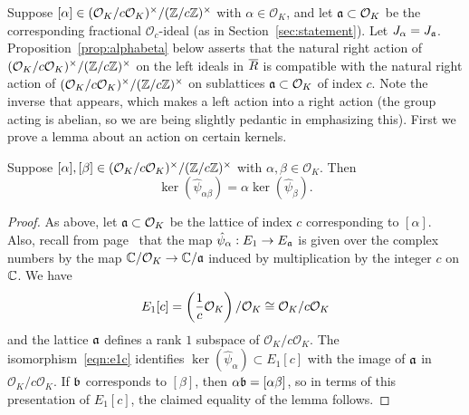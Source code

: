 \documentclass{article} \usepackage[active]{srcltx}
\renewcommand{\O}{\mathcal{O}}
\begin{document}
Suppose $ [\alpha] \in (\O_K/c\O_K)^{\times}/(\Z/c\Z)^{\times} $ with $\alpha \in
\O_K$, and let $\fa \subset \O_K$ be the corresponding fractional
$\O_c$-ideal (as in Section~\ref{sec:statement}).  Let $J_{\alpha} = J_{\mathfrak{a}}$.
Proposition~\ref{prop:alphabeta} below asserts that the natural right
action of $(\O_K/c\O_K)^{\times}/(\Z/c\Z)^{\times}$ on the left ideals in $\overline{R}$ is
compatible with the natural right action of
$(\O_K/c\O_K)^{\times}/(\Z/c\Z)^{\times}$ on sublattices $\a \subset \O_K$ of index
$c$.  Note the inverse that appears, which makes a left action
into a right action (the group acting is abelian, so we are
being slightly pedantic in emphasizing this).  First we prove a lemma about an
action on certain kernels.

\begin{lemma}\label{lem:keract}
Suppose $[\alpha],[\beta] \in (\O_K/c\O_K)^{\times}/(\Z/c\Z)^{\times} $ with $\alpha,\beta\in \O_K$.
Then 
$$
\ker(\hat{\psi}_{\alpha\beta})
 = \alpha \ker(\hat{\psi}_{\beta}).
$$
\end{lemma}
\begin{proof}
As above, let $\fa\subset \O_K$ be the lattice of index $c$ corresponding to $[\alpha]$.
Also, recall from page~\pageref{page:overc} that
the map $\hat{\psi}_{\alpha}: E_1 \to E_{\mathfrak{a}}$ is given over the complex
numbers by the map
$\C/\O_K \to \C/\fa$
induced by multiplication by the integer $c$ on $\mathbb{C}$.
We have
\begin{equation}\label{eqn:e1c}
 E_1[c] = \left(\frac{1}{c}\O_K\right) / \O_K \isom \O_K/c\O_K
\end{equation}
and the lattice $\mathfrak{a}$ defines a rank $1$ 
subspace of $\O_K/c\O_K$.  
The isomorphism~\eqref{eqn:e1c} 
identifies
$\ker(\hat{\psi}_{\alpha})\subset E_1[c]$ 
with the image of $\mathfrak{a}$ in $\O_K/c\O_K$.
If $\mathfrak{b}$ corresponds to $[\beta]$, then $\alpha\mathfrak{b} = [\alpha\beta]$,
so in terms of this presentation of $E_1[c]$, the claimed equality
of the lemma follows. 
\end{proof}
\end{document}
